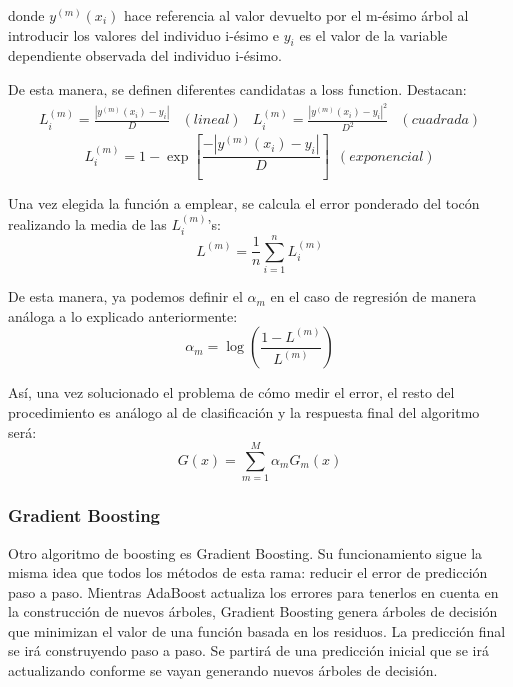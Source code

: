 \documentclass[12pt,twoside]{article}
\begin{document}
\noindent
donde $y^{(m)}(x_i)$ hace referencia al valor devuelto por el m-ésimo árbol al introducir los valores del individuo i-ésimo e $y_i$ es el valor de la variable dependiente observada del individuo i-ésimo.

De esta manera, se definen diferentes candidatas a loss function. Destacan:
\begin{equation*}
\begin{array}{cr|cr}
L_i^{(m)} = \frac{|y^{(m)}(x_i) - y_i|}{D} & (lineal) & L_i^{(m)} = \frac{|y^{(m)}(x_i) - y_i|^2}{D^2} & (cuadrada) 
\end{array}
\end{equation*}
\begin{equation*}
L_i^{(m)} = 1 - \exp \left[ \frac{-|y^{(m)}(x_i) - y_i|}{D} \right] \, \, \, (exponencial)
\end{equation*}

Una vez elegida la función a emplear, se calcula el error ponderado del tocón realizando la media de las $L_i^{(m)}$'s:
\begin{equation*}
L^{(m)} = \frac{1}{n}\sum_{i=1}^n L_i^{(m)}
\end{equation*}

De esta manera, ya podemos definir el $\alpha_m$ en el caso de regresión de manera análoga a lo explicado anteriormente:
\begin{equation*}
\alpha_m = \log \left( \frac{1 - L^{(m)}}{L^{(m)}} \right)
\end{equation*}

Así, una vez solucionado el problema de cómo medir el error, el resto del procedimiento es análogo al de clasificación y la respuesta final del algoritmo será:
\begin{equation*}
G(x) = \sum_{m=1}^M \alpha_m G_m(x)
\end{equation*}





\subsubsection{Gradient Boosting} \label{sec:GB}

Otro algoritmo de boosting es Gradient Boosting. Su funcionamiento sigue la misma idea que todos los métodos de esta rama: reducir el error de predicción paso a paso. Mientras AdaBoost actualiza los errores para tenerlos en cuenta en la construcción de nuevos árboles, Gradient Boosting genera árboles de decisión que minimizan el valor de una función basada en los residuos. La predicción final se irá construyendo paso a paso. Se partirá de una predicción inicial que se irá actualizando conforme se vayan generando nuevos árboles de decisión.
\end{document}
